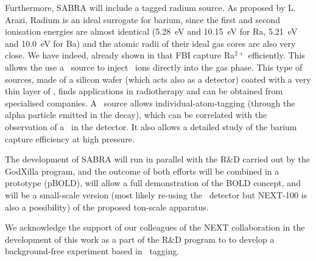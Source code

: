 \documentclass[a4paper,11pt]{article}
\begin{document}
Furthermore, SABRA will include  a tagged radium source. As proposed by L. Arazi, Radium is an ideal surrogate for barium, since  the first and second ionisation energies are almost identical (\SI{5.28}{eV} and \SI{10.15}{eV} for Ra, \SI{5.21}{eV} and \SI{10.0}{eV} for Ba) and the atomic radii of their ideal gas cores are also very close. We have indeed, already shown in\cite{Rivilla:2019vzd, Rivilla:2020cvm} that FBI capture Ra$^{2+}$ efficiently.  This allows the use a \TO\ source to inject \Rapp\ ions directly into the gas phase. This type of sources, made of a silicon wafer (which acts also as a detector) coated with a very thin layer of \TO, finds applications in radiotherapy and can be obtained from specialised companies. A \Rapp\ source allows individual-atom-tagging (through the alpha particle emitted in the decay), which can be correlated with the observation of a \Rapp\ in the detector. It also allows a detailed study of the barium capture efficiency at high pressure.  

The development of SABRA will run in parallel with the R\&D carried out by the GodXilla program, and the outcome of both efforts will be combined in a prototype (pBOLD), will allow a full demonstration of the BOLD concept, and will be a small-scale version (most likely re-using the \NEW\ detector but NEXT-100 is also a possibility) of the proposed ton-scale apparatus.
 

\acknowledgments
We acknowledge the support of our colleagues of the NEXT collaboration in the development of this work as a part of the R\&D program to to develop a background-free experiment based in \Bapp\ tagging. 

%


\end{document}
